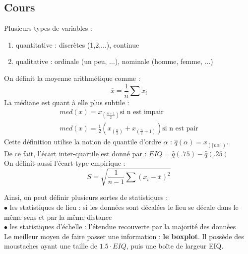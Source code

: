 \documentclass[../main.tex]{subfiles}
\begin{document}
\localtableofcontents
\subsection{Cours}
Plusieurs types de variables : \\
\begin{enumerate}
    \item quantitative : discrètes (1,2,$\dots$), continue\\
    \item qualitative : ordinale (un peu, $\dots$), nominale (homme, femme, $\dots$)\\
\end{enumerate}

On définit la moyenne arithmétique comme :\\
\begin{equation}
    \overline{x} = \frac{1}{n} \sum x_i
\end{equation}
La médiane est quant à elle plus subtile : \\
\begin{equation}
    \begin{split}
        med(x) = x_{(\frac{n+1}{2})} \textrm{si n est impair}\\
        med(x) = \frac{1}{2}(x_{(\frac{n}{2})} + x_{(\frac{n}{2}+1)}) \textrm{si n est pair}
    \end{split}
\end{equation}
Cette définition utilise la notion de quantile d'ordre $\alpha$ : $\hat{q}(\alpha) = x_{(\lceil n\alpha \rceil)}$.\\
De ce fait, l'écart inter-quartile est donné par : $EIQ = \hat{q}(.75)-\hat{q}(.25)$\\

On définit aussi l'écart-type empirique : \\
\begin{equation}
    S = \sqrt{\frac{1}{n-1} \sum (x_i-\overline{x})^2}
\end{equation}

Ainsi, on peut définir plusieurs sortes de statistiques :\\
$\bullet$ les statistiques de lieu : si les données sont décalées le lieu se décale dans le même sens et par la même distance\\
$\bullet$ les statistiques d'échelle : l'étendue recouverte par la majorité des données\\

Le meilleur moyen de faire passer une information : \textbf{le boxplot}. Il possède des moustaches ayant une taille de $1.5\cdot EIQ$, puis une boîte de largeur EIQ.\\
\end{document}
